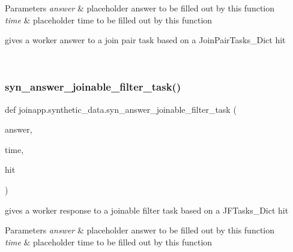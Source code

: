 \begin{DoxyParams}{Parameters}
{\em answer} & placeholder answer to be filled out by this function \\
\hline
{\em time} & placeholder time to be filled out by this function \begin{DoxyVerb}gives a worker answer to a join pair task based on a JoinPairTasks_Dict hit
\end{DoxyVerb}
 \\
\hline
\end{DoxyParams}
\mbox{\label{namespacejoinapp_1_1synthetic__data_ac76596b09f4f089a86c41525ae9fc069}} 
\subsubsection{\texorpdfstring{syn\_answer\_joinable\_filter\_task()}{syn\_answer\_joinable\_filter\_task()}}
{\footnotesize\ttfamily def joinapp.\+synthetic\+\_\+data.\+syn\+\_\+answer\+\_\+joinable\+\_\+filter\+\_\+task (\begin{DoxyParamCaption}\item[{}]{answer,  }\item[{}]{time,  }\item[{}]{hit }\end{DoxyParamCaption})}



gives a worker response to a joinable filter task based on a J\+F\+Tasks\+\_\+\+Dict hit 


\begin{DoxyParams}{Parameters}
{\em answer} & placeholder answer to be filled out by this function \\
\hline
{\em time} & placeholder time to be filled out by this function \\
\hline
\end{DoxyParams}
\mbox{\label{namespacejoinapp_1_1synthetic__data_a0dab322f06917c77e4a5061b9e70474a}} 
